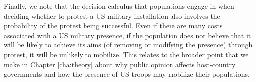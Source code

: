 







Finally, we note that the decision calculus that populations engage in when deciding whether to protest a US military installation also involves the probability of the protest being successful. Even if there are many costs associated with a US military presence, if the population does not believe that it will be likely to achieve its aims (of removing or modifying the presence) through protest, it will be unlikely to mobilize. This relates to the broader point that we make in Chapter \ref{cha:theory} about why public opinion affects host-country governments and how the presence of US troops may mobilize their populations.

